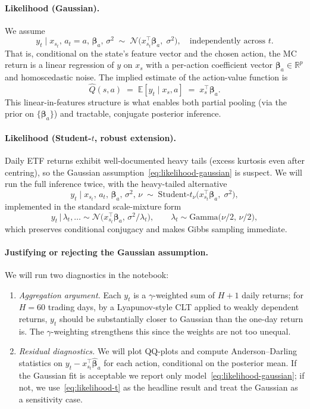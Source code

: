 \documentclass[11pt]{article}
\newcommand{\E}{\mathbb{E}}
\newcommand{\R}{\mathbb{R}}
\newcommand{\N}{\mathcal{N}}
\begin{document}
\paragraph{Likelihood (Gaussian).} We assume
\begin{equation}
\label{eq:likelihood-gaussian}
y_t \;\big|\; x_{s_t},\, a_t = a,\, \bm{\beta}_a,\, \sigma^2 \;\sim\; \N\!\big(x_{s_t}^\top \bm{\beta}_a,\; \sigma^2\big),
\quad \text{independently across } t.
\end{equation}
That is, conditional on the state's feature vector and the chosen action, the MC return is a linear regression of $y$ on $x_s$ with a per-action coefficient vector $\bm{\beta}_a \in \R^p$ and homoscedastic noise. The implied estimate of the action-value function is
\[
\widehat{Q}(s,a) \;=\; \E[y_t \mid x_s, a] \;=\; x_s^\top \bm{\beta}_a.
\]
This linear-in-features structure is what enables both partial pooling (via the prior on $\{\bm{\beta}_a\}$) and tractable, conjugate posterior inference.

\paragraph{Likelihood (Student-$t$, robust extension).} Daily ETF returns exhibit well-documented heavy tails (excess kurtosis even after centring), so the Gaussian assumption~\eqref{eq:likelihood-gaussian} is suspect. We will run the full inference twice, with the heavy-tailed alternative
\begin{equation}
\label{eq:likelihood-t}
y_t \;\big|\; x_{s_t},\, a_t,\, \bm{\beta}_a,\, \sigma^2,\, \nu \;\sim\; \mathrm{Student\text{-}}t_\nu\!\big(x_{s_t}^\top \bm{\beta}_a,\; \sigma^2\big),
\end{equation}
implemented in the standard scale-mixture form
\[
y_t \,\big|\, \lambda_t,\dots \sim \N\!\big(x_{s_t}^\top \bm{\beta}_a,\, \sigma^2/\lambda_t\big),
\qquad
\lambda_t \sim \mathrm{Gamma}\!\big(\nu/2,\, \nu/2\big),
\]
which preserves conditional conjugacy and makes Gibbs sampling immediate.

\paragraph{Justifying or rejecting the Gaussian assumption.} We will run two diagnostics in the notebook:
\begin{enumerate}[label=(\roman*),leftmargin=*]
\item \emph{Aggregation argument.} Each $y_t$ is a $\gamma$-weighted sum of $H+1$ daily returns; for $H=60$ trading days, by a Lyapunov-style CLT applied to weakly dependent returns, $y_t$ should be substantially closer to Gaussian than the one-day return is. The $\gamma$-weighting strengthens this since the weights are not too unequal.
\item \emph{Residual diagnostics.} We will plot QQ-plots and compute Anderson--Darling statistics on $y_t - x_{s_t}^\top \widehat{\bm{\beta}}_a$ for each action, conditional on the posterior mean. If the Gaussian fit is acceptable we report only model~\eqref{eq:likelihood-gaussian}; if not, we use~\eqref{eq:likelihood-t} as the headline result and treat the Gaussian as a sensitivity case.
\end{enumerate}
\end{document}
